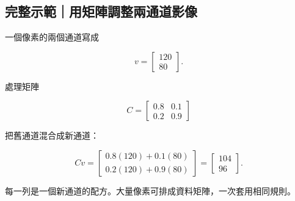 \documentclass[11pt,a4paper]{article}
\begin{document}
\begin{HandoutWorkedExample}

\subsection{完整示範｜用矩陣調整兩通道影像}\label{ux5b8cux6574ux793aux7bc4ux7528ux77e9ux9663ux8abfux6574ux5169ux901aux9053ux5f71ux50cf}

一個像素的兩個通道寫成

\[
v=\begin{bmatrix}120\\80\end{bmatrix}.
\]

處理矩陣

\[
C=\begin{bmatrix}0.8&0.1\\0.2&0.9\end{bmatrix}
\]

把舊通道混合成新通道：

\[
Cv=
\begin{bmatrix}
0.8(120)+0.1(80)\\
0.2(120)+0.9(80)
\end{bmatrix}
=\boxed{\begin{bmatrix}104\\96\end{bmatrix}}.
\]

每一列是一個新通道的配方。大量像素可排成資料矩陣，一次套用相同規則。

\end{HandoutWorkedExample}
\end{document}
